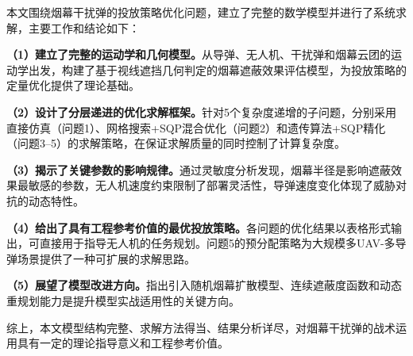 
本文围绕烟幕干扰弹的投放策略优化问题，建立了完整的数学模型并进行了系统求解，主要工作和结论如下：

\textbf{（1）建立了完整的运动学和几何模型。}从导弹、无人机、干扰弹和烟幕云团的运动学出发，构建了基于视线遮挡几何判定的烟幕遮蔽效果评估模型，为投放策略的定量优化提供了理论基础。

\textbf{（2）设计了分层递进的优化求解框架。}针对5个复杂度递增的子问题，分别采用直接仿真（问题1）、网格搜索+SQP混合优化（问题2）和遗传算法+SQP精化（问题3--5）的求解策略，在保证求解质量的同时控制了计算复杂度。

\textbf{（3）揭示了关键参数的影响规律。}通过灵敏度分析发现，烟幕半径是影响遮蔽效果最敏感的参数，无人机速度约束限制了部署灵活性，导弹速度变化体现了威胁对抗的动态特性。

\textbf{（4）给出了具有工程参考价值的最优投放策略。}各问题的优化结果以表格形式输出，可直接用于指导无人机的任务规划。问题5的预分配策略为大规模多UAV-多导弹场景提供了一种可扩展的求解思路。

\textbf{（5）展望了模型改进方向。}指出引入随机烟幕扩散模型、连续遮蔽度函数和动态重规划能力是提升模型实战适用性的关键方向。

综上，本文模型结构完整、求解方法得当、结果分析详尽，对烟幕干扰弹的战术运用具有一定的理论指导意义和工程参考价值。
